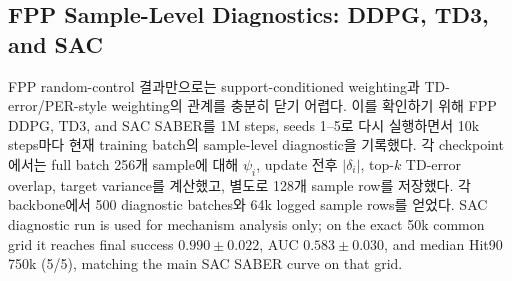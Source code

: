 \documentclass[letterpaper]{article}
\begin{document}
\subsection{FPP Sample-Level Diagnostics: DDPG, TD3, and SAC}

FPP random-control 결과만으로는 support-conditioned weighting과 TD-error/PER-style weighting의 관계를 충분히 닫기 어렵다. 이를 확인하기 위해 FPP DDPG, TD3, and SAC SABER를 1M steps, seeds 1--5로 다시 실행하면서 10k steps마다 현재 training batch의 sample-level diagnostic을 기록했다. 각 checkpoint에서는 full batch 256개 sample에 대해 \(\psi_i\), update 전후 \(|\delta_i|\), top-\(k\) TD-error overlap, target variance를 계산했고, 별도로 128개 sample row를 저장했다. 각 backbone에서 500 diagnostic batches와 64k logged sample rows를 얻었다. SAC diagnostic run is used for mechanism analysis only; on the exact 50k common grid it reaches final success \(0.990 \pm 0.022\), AUC \(0.583 \pm 0.030\), and median Hit90 750k (5/5), matching the main SAC SABER curve on that grid.
\end{document}
